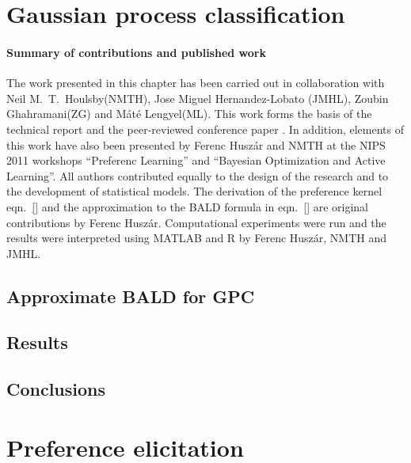 


\section{Gaussian process classification}

\paragraph{Summary of contributions and published work} The work presented in this chapter has been carried out in collaboration with Neil M.\ T.\ Houlsby(NMTH), Jose Miguel Hernandez-Lobato (JMHL), Zoubin Ghahramani(ZG) and Máté Lengyel(ML). This work forms the basis of the technical report \citep{arxivBALD} and the peer-reviewed conference paper \citep{NIPS2012}. In addition, elements of this work have also been presented by Ferenc Huszár and NMTH at the NIPS 2011 workshops ``Preferenc Learning'' and ``Bayesian Optimization and Active Learning''. All authors contributed equally to the design of the research and to the development of statistical models. The derivation of the preference kernel eqn.\ \eqref{} and the approximation to the BALD formula in eqn.\ \eqref{} are original contributions by Ferenc Huszár. Computational experiments were run and the results were interpreted using MATLAB and R by Ferenc Huszár, NMTH and JMHL.

\subsection{Approximate BALD for GPC}
\subsection{Results}
\subsection{Conclusions}

\section{Preference elicitation}

